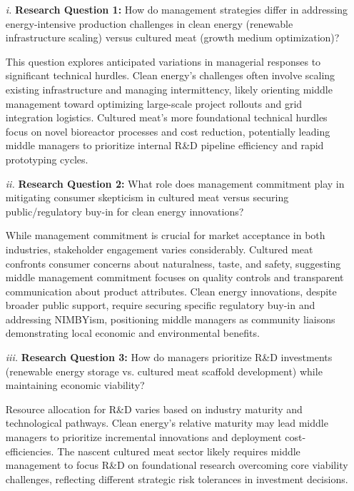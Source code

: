 	\begin{enumerate}
		\item[\textit{i.}] \textbf{Research Question 1:} How do management strategies differ in addressing energy-intensive production challenges in clean energy (renewable infrastructure scaling) versus cultured meat (growth medium optimization)?
		
		This question explores anticipated variations in managerial responses to significant technical hurdles. Clean energy’s challenges often involve scaling existing infrastructure and managing intermittency, likely orienting middle management toward optimizing large-scale project rollouts and grid integration logistics. Cultured meat’s more foundational technical hurdles focus on novel bioreactor processes and cost reduction, potentially leading middle managers to prioritize internal R\&D pipeline efficiency and rapid prototyping cycles.\\
		
		\item[\textit{ii.}] \textbf{Research Question 2:} What role does management commitment play in mitigating consumer skepticism in cultured meat versus securing public/regulatory buy-in for clean energy innovations?
		
		While management commitment is crucial for market acceptance in both industries, stakeholder engagement varies considerably. Cultured meat confronts consumer concerns about naturalness, taste, and safety, suggesting middle management commitment focuses on quality controls and transparent communication about product attributes. Clean energy innovations, despite broader public support, require securing specific regulatory buy-in and addressing NIMBYism, positioning middle managers as community liaisons demonstrating local economic and environmental benefits. \\
		
		\item[\textit{iii.}] \textbf{Research Question 3:} How do managers prioritize R\&D investments (renewable energy storage vs. cultured meat scaffold development) while maintaining economic viability?
		
		Resource allocation for R\&D varies based on industry maturity and technological pathways. Clean energy’s relative maturity may lead middle managers to prioritize incremental innovations and deployment cost-efficiencies. The nascent cultured meat sector likely requires middle management to focus R\&D on foundational research overcoming core viability challenges, reflecting different strategic risk tolerances in investment decisions. \\
	\end{enumerate}
	
